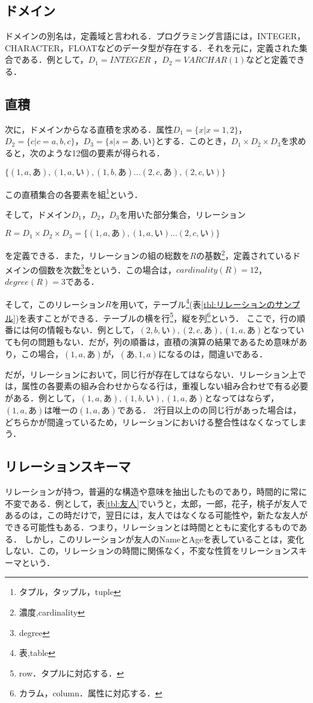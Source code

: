 \documentclass[a4paper,10pt]{jreport}
\begin{document}
\subsection{ドメイン}
ドメインの別名は，定義域と言われる．プログラミング言語には，INTEGER，CHARACTER，FLOATなどのデータ型が存在する．それを元に，定義された集合である．例として，$D_1=INTEGER$ ，$D_2=VARCHAR(1)$などと定義できる．
\subsection{直積}
\par 次に，ドメインからなる直積を求める．属性$D_1=\{x|x=1,2\}$，$D_2=\{c|c=a,b,c\}$，$D_3=\{s|s=あ,い\}$とする．このとき，$D_1 \times D_2 \times D_3$を求めると，次のような12個の要素が得られる．
\begin{center}
	$\{(1,a,あ),(1,a,い),(1,b,あ)...(2,c,あ),(2,c,い)\}$
\end{center}
この直積集合の各要素を組\footnote{タプル，タップル，tuple}という．
\par そして，ドメイン$D_1$，$D_2$，$D_3$を用いた部分集合，リレーション
\begin{center}
	$R=D_1 \times D_2 \times D_3=\{(1,a,あ),(1,a,い)...(2,c,い)\}$
\end{center}
を定義できる．また，リレーションの組の総数を$R$の基数\footnote{濃度,cardinality}，定義されているドメインの個数を次数\footnote{degree}をという．この場合は，$cardinality(R)=12$，$degree(R)=3$である．
\par そして，このリレーション$R$を用いて，テーブル\footnote{表,table}(表\ref{tbl:リレーションのサンプル})を表すことができる．テーブルの横を行\footnote{row．タプルに対応する．}，縦を列\footnote{カラム，column．属性に対応する．}という．
ここで，行の順番には何の情報もない．例として，$(2,b,い),(2,c,あ),(1,a,あ)$となっていても何の問題もない．だが，列の順番は，直積の演算の結果であるため意味があり，この場合，$(1,a,あ)$が，$(あ,1,a)$になるのは，間違いである．
\par だが，リレーションにおいて，同じ行が存在してはならない．リレーション上では，属性の各要素の組み合わせからなる行は，重複しない組み合わせで有る必要がある．例として，$(1,a,あ),(1,b,い),(1,a,あ)$となってはならず，$(1,a,あ)$は唯一の$(1,a,あ)$である．
2行目以上のの同じ行があった場合は，どちらかが間違っているため，リレーションにおいける整合性はなくなってしまう．

\subsection{リレーションスキーマ}
リレーションが持つ，普遍的な構造や意味を抽出したものであり，時間的に常に不変である．例として，表\ref{tbl:友人}でいうと，太郎，一郎，花子，桃子が友人であるのは，この時だけで，翌日には，友人ではなくなる可能性や，新たな友人ができる可能性もある．つまり，リレーションとは時間とともに変化するものである．
しかし，このリレーションが友人のNameとAgeを表していることは，変化しない．この，リレーションの時間に関係なく，不変な性質をリレーションスキーマという．



\end{document}
